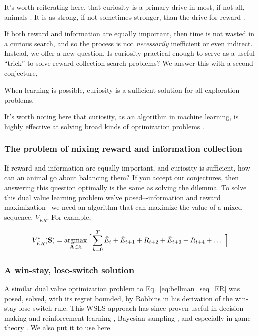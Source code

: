 It's worth reiterating here, that curiosity is a primary drive in most, if not all, animals \cite{Inglis2001}. It is as strong, if not sometimes stronger, than the drive for reward \cite{Loewenstein1994,Kidd2015,Gottlieb2018}.

If both reward and information are equally important, then time is not wasted in a curious search, and so the process is not \textit{necessarily} inefficient or even indirect. Instead, we offer a new question. Is curiosity practical enough to serve as a useful ``trick'' to solve reward collection search problems? We answer this with a second conjecture,

\begin{conjecture}
	When learning is possible, curiosity is a sufficient solution for all exploration problems.
\end{conjecture}

It's worth noting here that curiosity, as an algorithm in machine learning, is highly effective at solving broad kinds of optimization problems \cite{Schmidhuber1991,Stanton2018,Lehman2010,Mouret2011,Fister2019,Mouret2015,Colas2020,Cully2015,Pathak2017,Laversanne-Finot2018}. 

\subsubsection*{The problem of mixing reward and information collection}
If reward and information are equally important, and curiosity is sufficient, how can an animal go about balancing them? If you accept our conjectures, then answering this question optimally is the same as solving the dilemma. To solve this dual value learning problem we’ve posed–-information and reward maximization–-we need an algorithm that can maximize the value of a mixed sequence, $V_{\hat{E}R}$. For example,

\begin{equation}
	\label{eq:bellman_seq_ER}
	V^*_{\hat{E}R}(\mathbf{S}) = \operatorname*{argmax}_{\mathbf{A} \in \mathbb{A}} \Big [\sum_{k=0}^{T} \hat{E}_t + \hat{E}_{t+1} + R_{t+2} + \hat{E}_{t+3} + R_{t+4} + \ldots  \ \Big ]
\end{equation}

\subsubsection*{A win-stay, lose-switch solution}
A similar dual value optimization problem to Eq.~\ref{eq:bellman_seq_ER} was posed, solved, with its regret bounded, by Robbins \cite{Robbins1952} in his derivation of the win-stay lose-switch rule. This WSLS approach has since proven useful in decision making and reinforcement learning \cite{Estes1994TowardAS,Worthy2014}, Bayesian sampling \cite{Bonawitz2014}, and especially in game theory \cite{Nowak1993}. We also put it to use here. 


